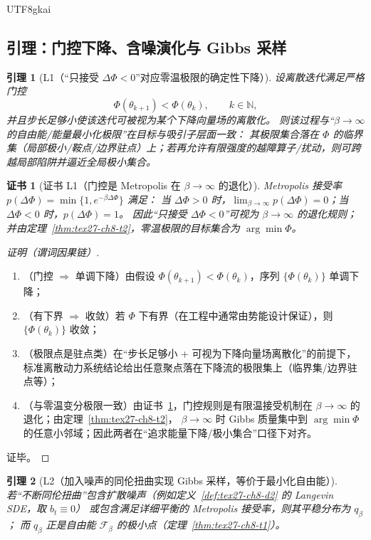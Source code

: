 \documentclass[12pt]{article}
\newtheorem{lemma}{引理}[section]
\newtheorem{Certificate}{证书}[section]
\newcommand{\NN}{\mathbb{N}}
\begin{document}
\begin{CJK*}{UTF8}{gkai}
\subsection{引理：门控下降、含噪演化与 Gibbs 采样}
\label{subsec:tex27-ch8-lemmas}

\begin{lemma}[L1（“只接受 $\Delta\Phi<0$”对应零温极限的确定性下降）]
\label{lem:tex27-ch8-l1}
设离散迭代满足严格门控
\[
  \Phi(\theta_{k+1})<\Phi(\theta_k),
  \qquad
  k\in\NN,
\]
并且步长足够小使该迭代可被视为某个下降向量场的离散化。
则该过程与“$\beta\to\infty$ 的自由能/能量最小化极限”在目标与吸引子层面一致：
其极限集合落在 $\Phi$ 的临界集（局部极小/鞍点/边界驻点）上；若再允许有限强度的越障算子/扰动，则可跨越局部陷阱并逼近全局极小集合。
\end{lemma}

\begin{Certificate}[证书 L1（门控是 Metropolis 在 $\beta\to\infty$ 的退化）]
\label{cert:tex27-ch8-l1}
Metropolis 接受率 $p(\Delta\Phi)=\min\{1,e^{-\beta\Delta\Phi}\}$ 满足：
当 $\Delta\Phi>0$ 时，$\lim_{\beta\to\infty}p(\Delta\Phi)=0$；当 $\Delta\Phi<0$ 时，$p(\Delta\Phi)=1$。
因此“只接受 $\Delta\Phi<0$”可视为 $\beta\to\infty$ 的退化规则；并由定理~\ref{thm:tex27-ch8-t2}，零温极限的目标集合为 $\arg\min\Phi$。
\end{Certificate}

\begin{proof}[证明（谓词因果链）]
\begin{enumerate}
  \item（门控 $\Rightarrow$ 单调下降）由假设 $\Phi(\theta_{k+1})<\Phi(\theta_k)$，序列 $\{\Phi(\theta_k)\}$ 单调下降；
  \item（有下界 $\Rightarrow$ 收敛）若 $\Phi$ 下有界（在工程中通常由势能设计保证），则 $\{\Phi(\theta_k)\}$ 收敛；
  \item（极限点是驻点类）在“步长足够小 + 可视为下降向量场离散化”的前提下，标准离散动力系统结论给出任意聚点落在下降流的极限集上（临界集/边界驻点等）；
  \item（与零温变分极限一致）由证书~\ref{cert:tex27-ch8-l1}，门控规则是有限温接受机制在 $\beta\to\infty$ 的退化；由定理~\ref{thm:tex27-ch8-t2}，
    $\beta\to\infty$ 时 Gibbs 质量集中到 $\arg\min\Phi$ 的任意小邻域；因此两者在“追求能量下降/极小集合”口径下对齐。
\end{enumerate}
证毕。
\end{proof}

\begin{lemma}[L2（加入噪声的同伦扭曲实现 Gibbs 采样，等价于最小化自由能）]
\label{lem:tex27-ch8-l2}
若“不断同伦扭曲”包含扩散噪声（例如定义~\ref{def:tex27-ch8-d2} 的 Langevin SDE，取 $b_t\equiv 0$）
或包含满足详细平衡的 Metropolis 接受率，则其平稳分布为 $q_\beta$；
而 $q_\beta$ 正是自由能 $\mathcal{F}_\beta$ 的极小点（定理~\ref{thm:tex27-ch8-t1}）。
\end{lemma}


\end{CJK*}
\end{document}
